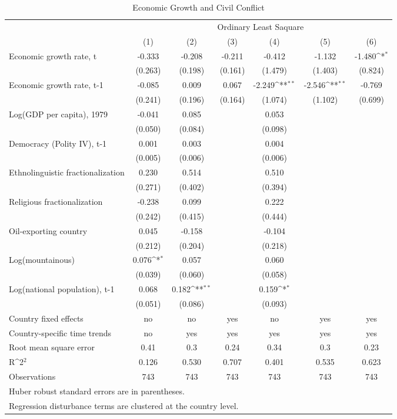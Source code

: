 \begin{table}[]
\caption{Economic Growth and Civil Conflict}
{
\def\sym#1{\ifmmode^{#1}\else\(^{#1}\)\fi}
\begin{tabular}{@{\extracolsep{2pt}}l*{6}{c}@{}}
\hline\hline
& \multicolumn{6}{c}{Ordinary Least Saquare} \\
\cline{2-7}
 & (1) & (2) & (3) & (4) & (5) & (6) \\
\hline
Economic growth rate, t & -0.333 & -0.208 & -0.211 & -0.412 & -1.132 & -1.480\sym{*} \\
 & (0.263) & (0.198) & (0.161) & (1.479) & (1.403) & (0.824) \\
Economic growth rate, t-1 & -0.085 & 0.009 & 0.067 & -2.249\sym{**} & -2.546\sym{**} & -0.769 \\
 & (0.241) & (0.196) & (0.164) & (1.074) & (1.102) & (0.699) \\
Log(GDP per capita), 1979 & -0.041 & 0.085 &  & 0.053 &  &  \\
 & (0.050) & (0.084) &  & (0.098) &  &  \\
Democracy (Polity IV), t-1 & 0.001 & 0.003 &  & 0.004 &  &  \\
 & (0.005) & (0.006) &  & (0.006) &  &  \\
Ethnolinguistic fractionalization & 0.230 & 0.514 &  & 0.510 &  &  \\
 & (0.271) & (0.402) &  & (0.394) &  &  \\
Religious fractionalization & -0.238 & 0.099 &  & 0.222 &  &  \\
 & (0.242) & (0.415) &  & (0.444) &  &  \\
Oil-exporting country & 0.045 & -0.158 &  & -0.104 &  &  \\
 & (0.212) & (0.204) &  & (0.218) &  &  \\
Log(mountainous) & 0.076\sym{*} & 0.057 &  & 0.060 &  &  \\
 & (0.039) & (0.060) &  & (0.058) &  &  \\
Log(national population), t-1 & 0.068 & 0.182\sym{**} &  & 0.159\sym{*} &  &  \\
 & (0.051) & (0.086) &  & (0.093) &  &  \\
Country fixed effects & no & no & yes & no & yes & yes \\
Country-specific time trends & no & yes & yes & yes & yes & yes \\
Root mean square error & 0.41 & 0.3 & 0.24 & 0.34 & 0.3 & 0.23 \\

\hline
R\sym{2} & 0.126 & 0.530 & 0.707 & 0.401 & 0.535 & 0.623 \\
Observations & 743 & 743 & 743 & 743 & 743 & 743 \\
\hline\hline
\multicolumn{7}{l}{\footnotesize Huber robust standard errors are in parentheses.}\vspace{-.25em} \\
\multicolumn{7}{l}{\footnotesize Regression disturbance terms are clustered at the country level.}
\end{tabular}
}
\end{table}